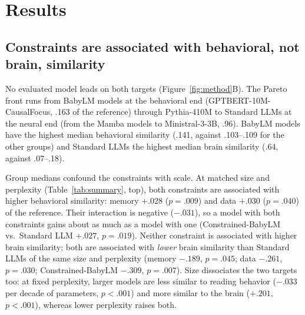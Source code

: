 \section{Results}
\label{sec:results}



\subsection{Constraints are associated with behavioral, not brain, similarity}
\label{sec:results-main}
\label{sec:results-all}

No evaluated model leads on both targets (Figure~\ref{fig:method}B). The Pareto front runs from BabyLM models at the behavioral end (GPTBERT-10M-CausalFocus, .163 of the reference) through Pythia-410M to Standard LLMs at the neural end (from the Mamba models to Ministral-3-3B, .96). BabyLM models have the highest median behavioral similarity (.141, against .103--.109 for the other groups) and Standard LLMs the highest median brain similarity (.64, against .07--.18).

Group medians confound the constraints with scale. At matched size and perplexity (Table~\ref{tab:summary}, top), both constraints are associated with higher behavioral similarity: memory $+.028$ ($p=.009$) and data $+.030$ ($p=.040$) of the reference. Their interaction is negative ($-.031$), so a model with both constraints gains about as much as a model with one (Constrained-BabyLM vs.\ Standard LLM $+.027$, $p=.019$). Neither constraint is associated with higher brain similarity; both are associated with \emph{lower} brain similarity than Standard LLMs of the same size and perplexity (memory $-.189$, $p=.045$; data $-.261$, $p=.030$; Constrained-BabyLM $-.309$, $p=.007$). Size dissociates the two targets too: at fixed perplexity, larger models are less similar to reading behavior ($-.033$ per decade of parameters, $p<.001$) and more similar to the brain ($+.201$, $p<.001$), whereas lower perplexity raises both.

